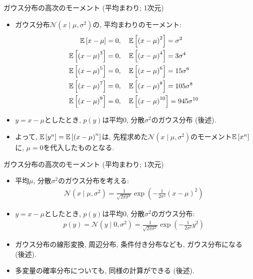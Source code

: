 \documentclass[dvipdfmx,notheorems,t]{beamer}
\begin{document}
\begin{frame}{ガウス分布の高次のモーメント (平均まわり; 1次元)}
\begin{itemize}
  \item ガウス分布$\mathcal{N}(x \mid \mu, \sigma^2)$の, 平均まわりのモーメント:
  \begin{align*}
    \operatorname{\mathbb{E}} \left[ x - \mu \right] = 0, \quad &
    \operatorname{\mathbb{E}} \left[ \left( x - \mu \right)^2 \right] = \sigma^2 \\
    \operatorname{\mathbb{E}} \left[ \left( x - \mu \right)^3 \right] = 0, \quad &
    \operatorname{\mathbb{E}} \left[ \left( x - \mu \right)^4 \right] = 3 \sigma^4 \\
    \operatorname{\mathbb{E}} \left[ \left( x - \mu \right)^5 \right] = 0, \quad &
    \operatorname{\mathbb{E}} \left[ \left( x - \mu \right)^6 \right] = 15 \sigma^6 \\
    \operatorname{\mathbb{E}} \left[ \left( x - \mu \right)^7 \right] = 0, \quad &
    \operatorname{\mathbb{E}} \left[ \left( x - \mu \right)^8 \right] = 105 \sigma^8 \\
    \operatorname{\mathbb{E}} \left[ \left( x - \mu \right)^9 \right] = 0, \quad &
    \operatorname{\mathbb{E}} \left[ \left( x - \mu \right)^{10} \right] = 945 \sigma^{10}
  \end{align*}
  \item $y = x - \mu$としたとき, $p(y)$は平均$0$, 分散$\sigma^2$のガウス分布 (後述).
  \item よって, $\operatorname{\mathbb{E}} \left[ y^n \right] = \operatorname{\mathbb{E}} \left[ \left( x - \mu \right)^n \right]$は,
  先程求めた$\mathcal{N}(x \mid \mu, \sigma^2)$のモーメント$\operatorname{\mathbb{E}} \left[ x^n \right]$に, $\mu = 0$を代入したものとなる.
\end{itemize}
\end{frame}

\begin{frame}{ガウス分布の高次のモーメント (平均まわり; 1次元)}
\begin{itemize}
  \item 平均$\mu$, 分散$\sigma^2$のガウス分布を考える:
  \begin{align*}
    \mathcal{N}(x \mid \mu, \sigma^2)
    = \frac{1}{\sqrt{2\pi \sigma^2}} \exp(-\frac{1}{2 \sigma^2} \left( x - \mu \right)^2)
  \end{align*}
  \item $y = x - \mu$としたとき, $p(y)$は平均$0$, 分散$\sigma^2$のガウス分布:
  \begin{align*}
    p(y) = \mathcal{N}(y \mid 0, \sigma^2) = \frac{1}{\sqrt{2\pi \sigma^2}} \exp(-\frac{1}{2 \sigma^2} y^2)
  \end{align*}
  \item ガウス分布の線形変換, 周辺分布, 条件付き分布なども, ガウス分布になる (後述).
  \item 多変量の確率分布についても, 同様の計算ができる (後述).
\end{itemize}
\end{frame}
\end{document}
